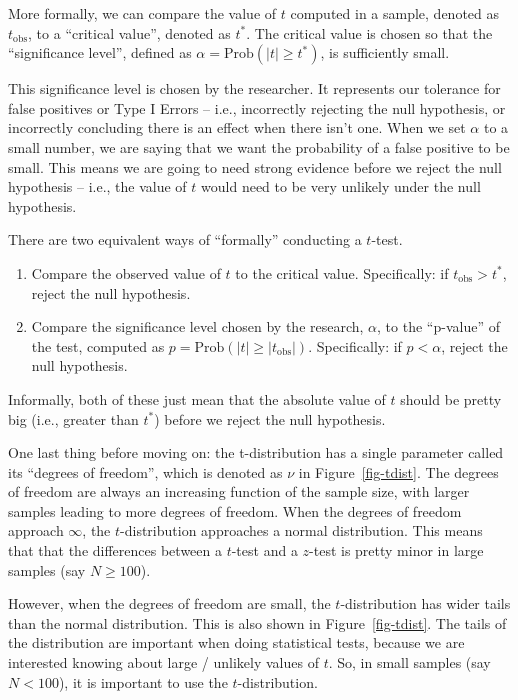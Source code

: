 \documentclass[
  letterpaper,
  DIV=11,
  numbers=noendperiod]{scrreprt}
\begin{document}
More formally, we can compare the value of \(t\) computed in a sample,
denoted as \(t_{\text{obs}}\), to a ``critical value'', denoted as
\(t^*\). The critical value is chosen so that the ``significance
level'', defined as \(\alpha = \text{Prob}(|t| \geq t^*)\), is
sufficiently small.

This significance level is chosen by the researcher. It represents our
tolerance for false positives or Type I Errors -- i.e., incorrectly
rejecting the null hypothesis, or incorrectly concluding there is an
effect when there isn't one. When we set \(\alpha\) to a small number,
we are saying that we want the probability of a false positive to be
small. This means we are going to need strong evidence before we reject
the null hypothesis -- i.e., the value of \(t\) would need to be very
unlikely under the null hypothesis.

There are two equivalent ways of ``formally'' conducting a \(t\)-test.

\begin{enumerate}
\def\labelenumi{\arabic{enumi}.}
\item
  Compare the observed value of \(t\) to the critical value.
  Specifically: if \(t_{\text{obs}} > t^*\), reject the null hypothesis.
\item
  Compare the significance level chosen by the research, \(\alpha\), to
  the ``p-value'' of the test, computed as
  \(p = \text{Prob}(|t| \geq |t_{\text{obs}}|)\). Specifically: if
  \(p < \alpha\), reject the null hypothesis.
\end{enumerate}

Informally, both of these just mean that the absolute value of \(t\)
should be pretty big (i.e., greater than \(t^*\)) before we reject the
null hypothesis.

One last thing before moving on: the t-distribution has a single
parameter called its ``degrees of freedom'', which is denoted as \(\nu\)
in Figure~\ref{fig-tdist}. The degrees of freedom are always an
increasing function of the sample size, with larger samples leading to
more degrees of freedom. When the degrees of freedom approach
\(\infty\), the \(t\)-distribution approaches a normal distribution.
This means that that the differences between a \(t\)-test and a
\(z\)-test is pretty minor in large samples (say \(N \geq 100\)).

However, when the degrees of freedom are small, the \(t\)-distribution
has wider tails than the normal distribution. This is also shown in
Figure~\ref{fig-tdist}. The tails of the distribution are important when
doing statistical tests, because we are interested knowing about large /
unlikely values of \(t\). So, in small samples (say \(N < 100\)), it is
important to use the \(t\)-distribution.
\end{document}
